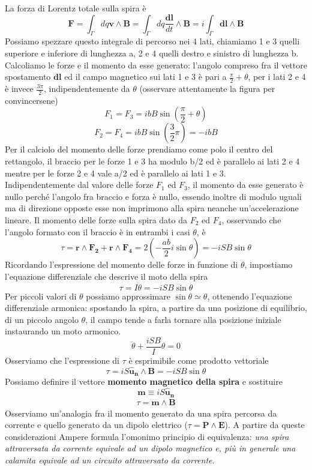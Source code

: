 \documentclass[
10pt, %
a4paper, %
oneside, %
headinclude,footinclude, %
BCOR5mm, %
]{scrartcl}
\begin{document}
\FloatBarrier
La forza di Lorentz totale sulla spira è
\[\mathbf{F}= \int_{\Gamma}dq\mathbf{v}\wedge\mathbf{B}= \int_{\Gamma}dq\frac{\mathbf{dl}}{dt}\wedge\mathbf{B}= i \int_{\Gamma}\mathbf{dl}\wedge\mathbf{B}\]
Possiamo spezzare questo integrale di percorso nei 4 lati, chiamiamo 1 e 3 quelli superiore e inferiore di lunghezza a, 2 e 4 quelli destro e sinistro di lunghezza b.\\
Calcoliamo le forze e il momento da esse generato: l'angolo compreso fra il vettore spostamento $\mathbf{dl}$ ed il campo magnetico sui lati 1 e 3 è pari a \(\frac{\pi}{2}+\theta\), per i lati 2 e 4 è invece \(\frac{3\pi}{2}\), indipendentemente da $\theta$ (osservare attentamente la figura per convincersene)
\[F_1=F_3=ibB\sin(\frac{\pi}{2}+\theta)\]
\[F_2=F_4 = ibB\sin(\frac{3}{2}\pi)= -ibB\]
Per il calciolo del momento delle forze prendiamo come polo il centro del rettangolo, il braccio per le forze 1 e 3 ha modulo b/2 ed è parallelo ai lati 2 e 4 mentre per le forze 2 e 4 vale a/2 ed è parallelo ai lati 1 e 3.\\
Indipendentemente dal valore delle forze  \(F_1\) ed \(F_3\), il momento da esse generato è nullo perché l'angolo fra braccio e forza è nullo, essendo inoltre di modulo uguali ma di direzione opposte esse non imprimono alla spira neanche un'accelerazione lineare.
Il momento delle forze sulla spira dato da \(F_2\) ed \(F_4\), osservando che l'angolo formato con il braccio è in entrambi i casi $\theta$, è
\[\tau= \mathbf{r}\wedge\mathbf{F_2}+\mathbf{r}\wedge\mathbf{F_4}=2(-\frac{ab}{2}i\sin\theta)= -i SB \sin\theta\]
Ricordando l'espressione del momento delle forze in funzione di $\theta$, impostiamo l'equazione differenziale che descrive il moto della spira
\[\tau=I\ddot{\theta}=- iSB\sin\theta\]
Per piccoli valori di $\theta$ possiamo approssimare $\sin\theta \simeq \theta$, ottenendo l'equazione differenziale armonica: spostando la spira, a partire da una posizione di equilibrio, di un piccolo angolo $\theta$, il campo tende a farla tornare alla posizione iniziale instaurando un moto armonico. 
\[\ddot{\theta}+ \frac{iSB}{I}\theta= 0 \]
Osserviamo che l'espressione di $\tau$ è esprimibile come prodotto vettoriale
\[\tau=iS\mathbf{\hat{u}_n}\wedge\mathbf{B}=-iSB\sin\theta\]
Possiamo definire il vettore \textbf{momento magnetico della spira} e sostituire
\[\mathbf{m}\equiv iS\mathbf{\hat{u}_n}\] 
\begin{align}\label{eq:momento_spira}
	\tau=\mathbf{m}\wedge\mathbf{B}
\end{align}
Osserviamo un'analogia fra il momento generato da una spira percorsa da corrente e quello generato da un dipolo elettrico ($\tau=\mathbf{P}\wedge\mathbf{E}$). A partire da queste considerazioni Ampere formula l'omonimo principio di equivalenza: \textit{una spira attraversata da corrente equivale ad un dipolo magnetico e, più in generale una calamita equivale ad un circuito attraversato da corrente}.\\
\end{document}
